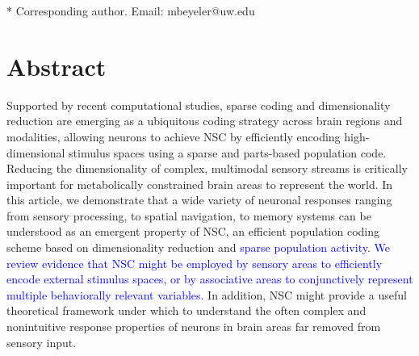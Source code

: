 \documentclass[10pt,letterpaper]{article}
\newcommand{\revise}[1]{\textcolor{blue}{#1}}
\begin{document}
\begin{flushleft}


* Corresponding author. Email: mbeyeler@uw.edu




\end{flushleft}
\section*{Abstract}
Supported by recent computational studies,
sparse coding and dimensionality reduction are emerging as a ubiquitous coding strategy  across brain regions and modalities, allowing neurons to achieve \acf{NSC} by efficiently encoding high-dimensional stimulus spaces using a sparse and parts-based population code.
Reducing the dimensionality of complex, multimodal sensory streams is critically important for metabolically constrained brain areas to represent the world.
In this article, we demonstrate that a wide variety of neuronal responses
ranging from sensory processing, to spatial navigation, to memory systems
can be understood as an emergent property of \acs{NSC},
an efficient population coding scheme
based on dimensionality reduction and \revise{sparse population activity}.
\revise{We review evidence that \acs{NSC} might be employed by sensory areas to efficiently
encode external stimulus spaces, or by associative areas to conjunctively represent
multiple behaviorally relevant variables.}
In addition, \acs{NSC} might provide a useful theoretical framework under which
to understand the often complex and nonintuitive response properties
of neurons in brain areas far removed from sensory input.



\end{document}
